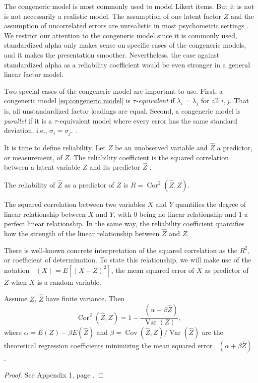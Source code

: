 \documentclass[twoside]{article}
\DeclareMathOperator{\Var}{Var}
\DeclareMathOperator{\Cor}{Cor}
\DeclareMathOperator{\Cov}{Cov}
\DeclareMathOperator{\MSE}{MSE_Z}
\begin{document}
The congeneric model is most commonly used to model Likert items. But it is not is not necessarily a realistic model. The assumption of one latent factor $Z$ and the assumption of uncorrelated errors are unrealistic in most psychometric settings \citep[][Section 1.2 -- 1.3]{Green2009-le}. We restrict our attention to the congeneric model since it is commonly used, standardized alpha only makes sense on specific cases of the congeneric models, and it makes the presentation smoother. Nevertheless, the case against standardized alpha as a reliability coefficient would be even stronger in a general linear factor model. 

Two special cases of the congeneric model are important to use. First, a congeneric model \eqref{eq:congeneric model} is \textit{$\tau$-equivalent} if $\lambda_{i}=\lambda_{j}$ for all $i,j$. That is, all unstandardized factor loadings are equal. Second, a congeneric model is \textit{parallel} if it is a $\tau$-equivalent model where every error has the same standard deviation, i.e., $\sigma_i = \sigma_j$. \citep[][Section 2.13]{Lord1968-ax}. 

It is time to define reliability. Let $Z$ be an unobserved variable and $\hat{Z}$ a predictor, or measurement, of $Z$. The reliability coefficient is the squared correlation between a latent variable $Z$ and its predictor $\hat{Z}$ \citep[][p. 61]{Lord1968-ax}. 

\begin{defn}\label{defn:reliability} The reliability of $\hat{Z}$ as a predictor of $Z$ is $ R=\Cor^{2}(\hat{Z},Z)$.
\end{defn} 

The squared correlation between two variables $X$ and $Y$ quantifies the degree of linear relationship between $X$ and $Y$, with $0$ being no linear relationship and $1$ a perfect linear relationship. In the same way, the reliability coefficient quantifies how the strength of the linear relationship between $\hat{Z}$ and $Z$.

There is well-known concrete interpretation of the squared correlation as the $R^2$, or coefficient of determination. To state this relationship, we will make use of the notation $\MSE(X) = E[(X-Z)^2]$, the mean squared error of $X$ as predictor of $Z$ when $X$ is a random variable.

\begin{lem}
\label{lem:r^2 and correlation}Assume $Z$, $\hat{Z}$ have finite
variance. Then 
\begin{equation}
\Cor^{2}(\hat{Z},Z)=1-\frac{\MSE(\alpha+\beta\hat{Z})}{\Var(Z)},\label{eq:rsq and correlation}
\end{equation}
where $\alpha=E(Z)-\beta E(\hat{Z})$ and $\beta=\Cov(\hat{Z},Z)/\Var(\hat{Z})$ are the theoretical regression coefficients minimizing the mean squared error $\MSE(\alpha+\beta\hat{Z})$. 
\end{lem}
\begin{proof}
See Appendix 1, page \pageref{proof:r^2 and correlation}.
\end{proof}
\end{document}
